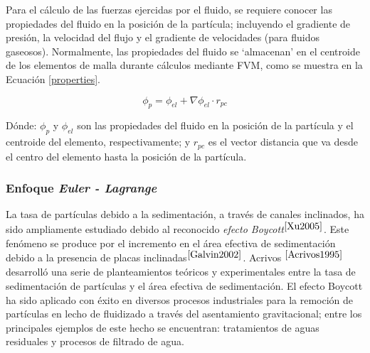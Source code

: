 \noindent
\justify

Para el c\'alculo de las fuerzas ejercidas por el fluido, se requiere conocer las propiedades del fluido en la posici\'on de la part\'icula; incluyendo el gradiente de presi\'on, la velocidad del flujo y el gradiente de velocidades (para fluidos gaseosos). Normalmente, las propiedades del fluido se `almacenan' en el centroide de los elementos de malla durante c\'alculos mediante FVM, como se muestra en la Ecuaci\'on \ref{properties}.

\begin{equation}
\phi _p = \phi _{el} + \nabla \phi _{el} \cdot r_{pc}
\label{properties}
\end{equation}

\noindent
\justify

D\'onde: $\phi _p$ y $\phi _{el}$ son las propiedades del fluido en la posici\'on de la part\'icula y el centroide del elemento, respectivamente; y $r_{pc}$ es el vector distancia que va desde el centro del elemento hasta la posici\'on de la part\'icula. 

\subsubsection{Enfoque \textit{Euler - Lagrange}} \label{EuLag}

\noindent
\justify

La tasa de part\'iculas debido a la sedimentaci\'on, a trav\'es de canales inclinados, ha sido ampliamente estudiado debido al reconocido \textit{efecto Boycott}$^{\cite{Xu2005}}$. Este fen\'omeno se produce por el incremento en el \'area efectiva de sedimentaci\'on debido a la presencia de placas inclinadas$^{\cite{Galvin2002}}$. Acrivos $^{\cite{Acrivos1995}}$ desarroll\'o una serie de planteamientos te\'oricos y experimentales entre la tasa de sedimentaci\'on de part\'iculas y el \'area efectiva de sedimentaci\'on. El efecto Boycott ha sido aplicado con \'exito en diversos procesos industriales para la remoci\'on de part\'iculas en lecho de fluidizado a trav\'es del asentamiento gravitacional; entre los principales ejemplos de este hecho se encuentran: tratamientos de aguas residuales y procesos de filtrado de agua.

\noindent
\justify

